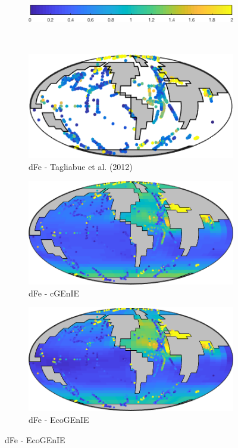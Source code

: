 \documentclass{article}
\begin{document}
\begin{figure}[htp]
\begin{subfigure}{.33\textwidth}
\end{subfigure}
\\[+0.2cm]
\begin{subfigure}{.5\textwidth}
 \includegraphics[width=0.95\linewidth]{../Separate_figures/ECOGEM/ocn_PO4_clrbr.png}
\end{subfigure}
\\
\begin{subfigure}{.33\textwidth}
 \caption{dFe - Tagliabue et al. (2012)}
 \includegraphics[width=0.95\linewidth]{../Separate_figures/OBSERVATIONS/surface_fe.png}
\end{subfigure}%
\begin{subfigure}{.33\textwidth}
 \caption{dFe - cGEnIE}
 \includegraphics[width=0.95\linewidth]{../Separate_figures/BIOGEM/ocn_TDFe.png}
\end{subfigure}%
\begin{subfigure}{.33\textwidth}
 \caption{dFe - EcoGEnIE}
 \includegraphics[width=0.95\linewidth]{../Separate_figures/ECOGEM/ocn_TDFe.png}

\end{subfigure}
\end{figure}
\end{document}
